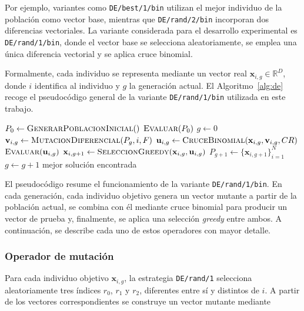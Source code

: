Por ejemplo, variantes como \texttt{DE/best/1/bin} utilizan el mejor individuo de la población como vector base, mientras que \texttt{DE/rand/2/bin} incorporan dos diferencias vectoriales. La variante considerada para el desarrollo experimental es \texttt{DE/rand/1/bin}, donde el vector base se selecciona aleatoriamente, se emplea una única diferencia vectorial y se aplica cruce binomial.

Formalmente, cada individuo se representa mediante un vector real
\(\mathbf{x}_{i,g} \in \mathbb{R}^D\), donde \(i\) identifica al individuo y
\(g\) la generación actual. El Algoritmo~\ref{alg:de} recoge el pseudocódigo
general de la variante \texttt{DE/rand/1/bin} utilizada en este trabajo.

\begin{algorithm}[htbp]
    \begin{algorithmic}[1]
        \State $P_0 \gets \textsc{GenerarPoblacionInicial}()$
        \State $\textsc{Evaluar}(P_0)$
        \State $g \gets 0$
        \State $\mathbf{v}_{i,g} \gets \textsc{MutacionDiferencial}(P_g, i, F)$
        \State $\mathbf{u}_{i,g} \gets \textsc{CruceBinomial}(\mathbf{x}_{i,g}, \mathbf{v}_{i,g}, CR)$
        \State $\textsc{Evaluar}(\mathbf{u}_{i,g})$
        \State $\mathbf{x}_{i,g+1} \gets \textsc{SeleccionGreedy}(\mathbf{x}_{i,g}, \mathbf{u}_{i,g})$
        \EndFor
        \State $P_{g+1} \gets \{\mathbf{x}_{i,g+1}\}_{i=1}^{N}$
        \State $g \gets g + 1$
        \EndWhile
        \State \Return mejor solución encontrada
    \end{algorithmic}
    \caption{\textit{Differential Evolution} (DE).}
    \label{alg:de}
\end{algorithm}

El pseudocódigo resume el funcionamiento de la variante
\texttt{DE/rand/1/bin}. En cada generación, cada individuo objetivo genera un vector mutante a partir de la población actual, se combina con él mediante cruce binomial para producir un vector de prueba y, finalmente, se aplica una selección \textit{greedy} entre ambos. A continuación, se describe cada uno de estos operadores con mayor detalle.

\subsubsection{Operador de mutación}

Para cada individuo objetivo \(\mathbf{x}_{i,g}\), la estrategia \texttt{DE/rand/1} selecciona aleatoriamente tres índices \(r_0\), \(r_1\) y \(r_2\), diferentes entre sí y distintos de \(i\). A partir de los vectores correspondientes se construye un vector mutante mediante

